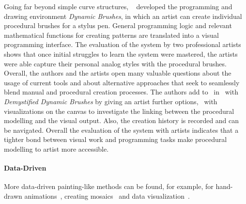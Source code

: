 Going far beyond simple curve structures, \citeauthor*{jacobs_2018_dbe}~\cite{jacobs_2018_dbe} developed the programming and drawing environment \textit{Dynamic Brushes}, in which an artist can create individual procedural brushes for a stylus pen. General programming logic and relevant mathematical functions for creating patterns are translated into a visual programming interface. The evaluation of the system by two professional artists shows that once initial struggles to learn the system were mastered, the artists were able capture their personal analog styles with the procedural brushes. Overall, the authors and the artists open many valuable questions about the usage of current tools and about alternative approaches that seek to seamlessly blend manual and procedural creation processes. The authors add to~\cite{jacobs_2018_dbe} in~\cite{li_2020_sva} with \textit{Demystified Dynamic Brushes} by giving an artist further options, \eg~with visualizations on the canvas to investigate the linking between the procedural modelling and the visual output. Also, the creation history is recorded and can be navigated. Overall the evaluation of the system with artists indicates that a tighter bond between visual work and programming tasks make procedural modelling to artist more accessible.

\paragraph*{Data-Driven}
\label{para:analysis_curves_datadriven}


More data-driven painting-like methods can be found, for example, for hand-drawn animations~\cite{xing_2015_aha}, creating mosaics~\cite{igarashi_2010_dde,abdrashitov_2014_msi} and data visualization~\cite{xia_2018_ddc}.



